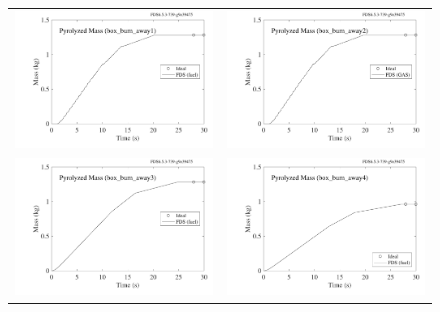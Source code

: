 \documentclass[11pt]{book}
\begin{document}
\begin{figure}[p]
\begin{tabular*}{\textwidth}{lr}
\includegraphics[width=3.2in]{SCRIPT_FIGURES/box_burn_away1} &
\includegraphics[width=3.2in]{SCRIPT_FIGURES/box_burn_away2} \\
\includegraphics[width=3.2in]{SCRIPT_FIGURES/box_burn_away3} &
\includegraphics[width=3.2in]{SCRIPT_FIGURES/box_burn_away4} \\

\end{tabular*}
\end{figure}
\end{document}
